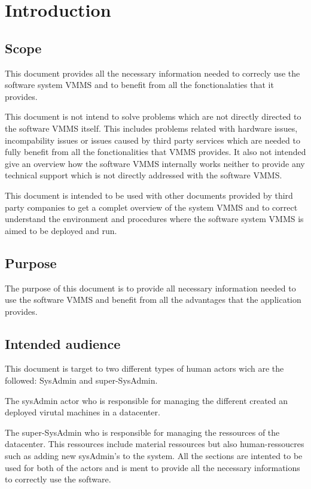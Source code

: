 \chapter{Introduction}
\label{chap:introduction}

\section{Scope}
This document provides all the necessary information needed to correcly use the
software system VMMS and to benefit from all the fonctionalaties that
it provides.

This document is not intend to solve problems which are not directly directed to
the software VMMS itself. This includes problems related with hardware
issues, incompability issues or issues caused by third party services which are
needed to fully benefit from all the fonctionalities that VMMS
provides. It also not intended give an overview how the software VMMS
internally works neither to provide any technical support which is not directly 
addressed with the software VMMS.

This document is intended to be used with other documents provided by third
party companies to get a complet overview of the system VMMS and to
correct understand the environment and procedures where the software system
VMMS is aimed to be deployed and run.


\section{Purpose}
The purpose of this document is to provide all necessary information
needed to use the software VMMS and benefit from all the advantages that the
application provides.


\section{Intended audience}
This document is target to two different types of human actors wich are the 
followed: SysAdmin and super-SysAdmin.

The sysAdmin actor who is responsible for managing the different created an
deployed virutal machines in a datacenter.

The super-SysAdmin who is responsible for managing the ressources of the
datacenter. This ressources include material ressources but also
human-ressoucres such as adding new sysAdmin's to the system. All the sections
are intented to be used for both of the actors and is ment to provide all the 
necessary informations to correctly use the software.



